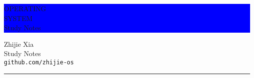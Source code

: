 \begin{titlepage} %
	
	
	\colorbox{blue}{
		\parbox[t]{0.93\textwidth}{ %
			\parbox[t]{0.91\textwidth}{ %
				\raggedleft %
				\fontsize{50pt}{80pt}\selectfont %
				\vspace{0.4cm} %
				
				OPERATING\\
				SYSTEM\\
                Study Notes\\
				
				\vspace{0.4cm} %
			}
		}
	}
	
	\vfill %
	
	
	\parbox[t]{0.93\textwidth}{ %
		\raggedleft %
		\large %
		{\Large Zhijie Xia}\\[4pt] %
		Study Notes\\
		\texttt{github.com/zhijie-os}\\
		
		\hfill\rule{0.2\linewidth}{1pt}%
	}
	
\end{titlepage}